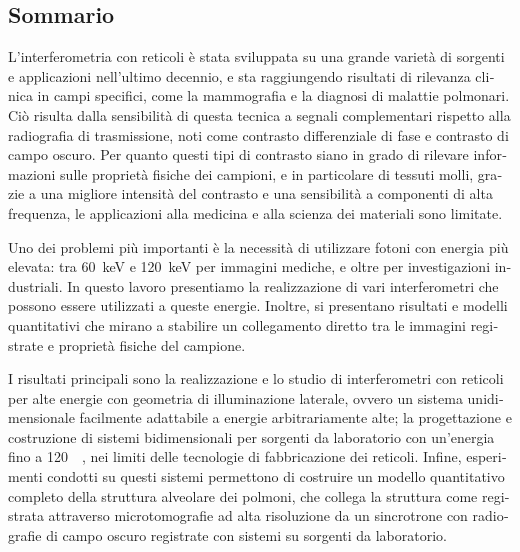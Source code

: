 \begin{otherlanguage}{italian}
\chapter*{Sommario}
L'interferometria con reticoli \`e stata sviluppata su una grande variet\`a
di sorgenti e applicazioni nell'ultimo decennio, e sta raggiungendo
risultati di rilevanza clinica in campi specifici, come la mammografia e la
diagnosi di malattie polmonari. Ci\`o risulta dalla sensibilit\`a di questa
tecnica a segnali complementari rispetto alla radiografia di trasmissione,
noti come contrasto differenziale di fase e contrasto di campo oscuro. Per
quanto questi tipi di contrasto siano in
grado di rilevare informazioni sulle propriet\`a fisiche dei campioni, e in
particolare di tessuti molli, grazie a una migliore intensit\`a del
contrasto e una sensibilit\`a a componenti di alta frequenza, le
applicazioni alla medicina e alla scienza dei materiali sono limitate.

Uno dei problemi pi\`u importanti \`e la necessit\`a di utilizzare 
fotoni con energia pi\`u elevata: tra \SI{60}{\kilo\eV} e
\SI{120}{\kilo\eV} per immagini mediche, e oltre per investigazioni
industriali. In questo lavoro presentiamo la realizzazione di vari
interferometri che possono essere utilizzati a queste energie. Inoltre,
si presentano risultati e modelli quantitativi che mirano a stabilire un
collegamento diretto tra le immagini registrate e propriet\`a fisiche del
campione.

I risultati principali sono la realizzazione e lo studio di interferometri
con reticoli per alte energie con geometria di illuminazione laterale,
ovvero un sistema unidimensionale facilmente adattabile a energie
arbitrariamente alte; la progettazione e costruzione di sistemi
bidimensionali per sorgenti da laboratorio con un'energia fino a
\SI{120}{\kilo\voltpeak}, nei limiti delle tecnologie di fabbricazione dei
reticoli. Infine, esperimenti condotti su questi sistemi permettono di
costruire un modello quantitativo completo della struttura alveolare dei
polmoni, che collega la struttura come registrata attraverso microtomografie
ad alta risoluzione da un sincrotrone con radiografie di campo oscuro
registrate con sistemi su sorgenti da laboratorio.
\end{otherlanguage}

\endgroup

\vfill
